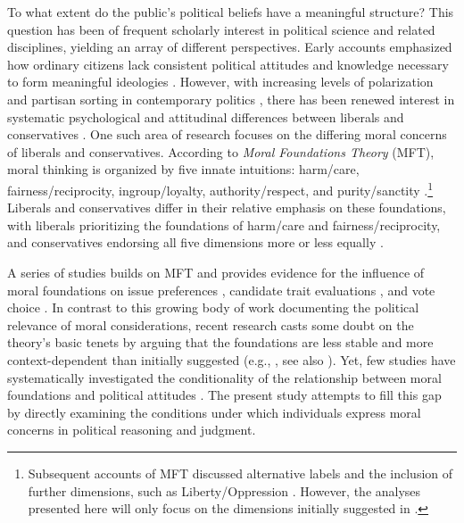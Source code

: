 \documentclass[12pt]{article}
\begin{document}
To what extent do the public's political beliefs have a meaningful structure? This question has been of frequent scholarly interest in political science and related disciplines, yielding an array of different perspectives. Early accounts emphasized how ordinary citizens lack consistent political attitudes and knowledge necessary to form meaningful ideologies \citep{converse1964nature}. However, with increasing levels of polarization and partisan sorting in contemporary politics \citep[e.g.][]{mason2014disrespectfully}, there has been renewed interest in systematic psychological and attitudinal differences between liberals and conservatives \citep{jost2006end}. One such area of research focuses on the differing moral concerns of liberals and conservatives. According to \textit{Moral Foundations Theory} (MFT), moral thinking is organized by five innate intuitions: harm/care, fairness/reciprocity, ingroup/loyalty, authority/respect, and purity/sanctity \citep{haidt2008moral,graham2011mapping}.\footnote{Subsequent accounts of MFT discussed alternative labels and the inclusion of further dimensions, such as Liberty/Oppression \citep[c.f.,][]{graham2013moral,haidt2012righteous}. However, the analyses presented here will only focus on the dimensions initially suggested in \citet{haidt2008moral}.} Liberals and conservatives differ in their relative emphasis on these foundations, with liberals prioritizing the foundations of harm/care and fairness/reciprocity, and conservatives endorsing all five dimensions more or less equally \citep{graham2009liberals}.

A series of studies builds on MFT and provides evidence for the influence of moral foundations on issue preferences \citep{koleva2012tracing, kertzer2014moral, low2015moral, clifford2015concerns}, candidate trait evaluations \citep{clifford2014linking}, and vote choice \citep{iyer2010beyond, franks2015using}. In contrast to this growing body of work documenting the political relevance of moral considerations, recent research casts some doubt on the theory's basic tenets by arguing that the foundations are less stable and more context-dependent than initially suggested (e.g., \citealt{smith2016intuitive}, see also \citealt{suhler2011can}). Yet, few studies have systematically investigated the conditionality of the relationship between moral foundations and political attitudes \citep[see][for a notable exception]{clifford2015concerns}. The present study attempts to fill this gap by directly examining the conditions under which individuals express moral concerns in political reasoning and judgment. 
\end{document}
